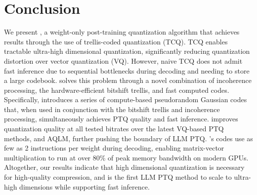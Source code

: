 \section{Conclusion}

We present \qt, a weight-only post-training quantization algorithm that achieves \sota results through the use of trellis-coded quantization (TCQ).
TCQ enables tractable ultra-high dimensional quantization, significantly reducing quantization distortion over vector quantization (VQ).
However, naive TCQ does not admit fast inference due to sequential bottlenecks during decoding and needing to store a large codebook.
\qts solves this problem through a novel combination of incoherence processing, the hardware-efficient bitshift trellis, and fast computed codes.
Specifically, \qts introduces a series of compute-based pseudorandom Gaussian codes that, when used in conjunction with the bitshift trellis and incoherence processing, simultaneously achieves \sota PTQ quality and fast inference. 
\qts improves quantization quality at all tested bitrates over the latest VQ-based PTQ methods, \qss and AQLM, further pushing the boundary of LLM PTQ.
\qt's codes use as few as 2 instructions per weight during decoding, enabling matrix-vector multiplication to run at over 80\% of peak memory bandwidth on modern GPUs.
Altogether, our results indicate that high dimensional quantization is necessary for high-quality compression, and \qts is the first LLM PTQ method to scale to ultra-high dimensions while supporting fast inference.
